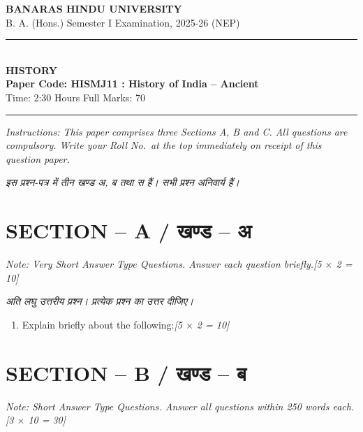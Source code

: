 \documentclass[11pt,a4paper]{article}
\newcommand{\pts}[1]{\hfill \textit{[#1]}}
\begin{document}
\begin{center}
  {\large\bfseries BANARAS HINDU UNIVERSITY}\\[2pt]
  {\normalsize B. A. (Hons.) Semester I Examination, 2025-26 (NEP)}\\[6pt]
  \rule{0.8\linewidth}{0.5pt}\\[6pt]
  {\large\bfseries HISTORY}\\[4pt]
  {\large\bfseries Paper Code: HISMJ11 : History of India -- Ancient}\\[4pt]
  {\normalsize Time: 2:30 Hours \hfill Full Marks: 70}
\end{center}
\rule{\linewidth}{0.4pt}
\smallskip

\noindent \textit{Instructions: This paper comprises three Sections A, B and C. All questions are compulsory. Write your Roll No.\ at the top immediately on receipt of this question paper.}

\smallskip
\noindent \textit{इस प्रश्न-पत्र में तीन खण्ड अ, ब तथा स हैं। सभी प्रश्न अनिवार्य हैं।}

\bigskip

\section*{SECTION -- A / खण्ड -- अ}
\noindent \textit{Note: Very Short Answer Type Questions. Answer each question briefly.}\pts{5 $\times$ 2 = 10}

\noindent \textit{अति लघु उत्तरीय प्रश्न। प्रत्येक प्रश्न का उत्तर दीजिए।}

\begin{enumerate}[label=\textbf{\arabic*.},leftmargin=*,itemsep=8pt]
  \item Explain briefly about the following:\pts{5 $\times$ 2 = 10}
\end{enumerate}

\bigskip

\section*{SECTION -- B / खण्ड -- ब}
\noindent \textit{Note: Short Answer Type Questions. Answer all questions within 250 words each.}\pts{3 $\times$ 10 = 30}
\end{document}
